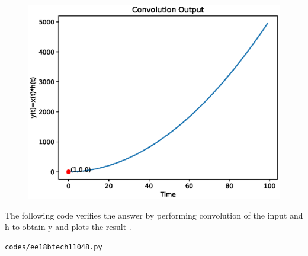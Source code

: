 \begin{enumerate}[label=\thesubsection.\arabic*.,ref=\thesubsection.\theenumi]
\begin{figure}[!ht]
\centering
  \includegraphics[width=\columnwidth]{./figs/ee18btech11048.eps}
  \caption{}
  \label{fig:ee18btech11048}
\end{figure}


The following code verifies the answer by performing convolution of the input and h to obtain y and plots the result .
\begin{lstlisting}
codes/ee18btech11048.py
\end{lstlisting}

\end{enumerate}
